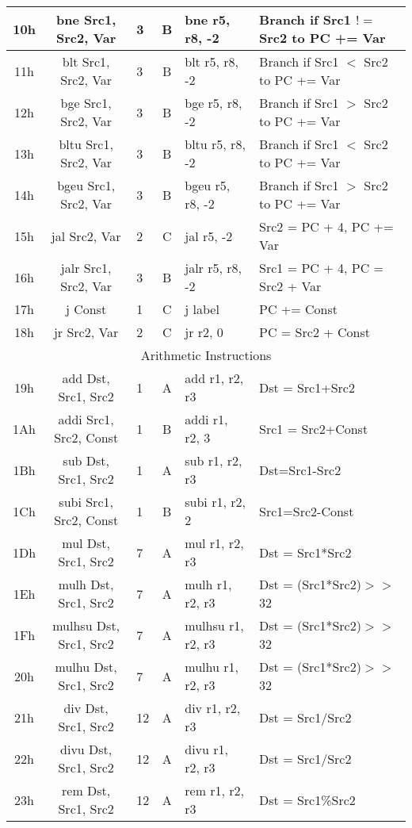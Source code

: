 \documentclass[]{article}
\begin{document}
\begin{longtable}{|c|c|l|c|l|p{5cm}|}
	10h & bne Src1, Src2, Var & 3 & B & bne r5, r8, -2 & Branch if Src1 $!=$ Src2 to PC += Var \\
	\hline
	11h & blt Src1, Src2, Var & 3 & B & blt r5, r8, -2 & Branch if Src1 $<$ Src2 to PC += Var \\
	\hline
	12h & bge Src1, Src2, Var & 3 & B & bge r5, r8, -2 & Branch if Src1 $>$ Src2 to PC += Var \\
	\hline
	13h & bltu Src1, Src2, Var & 3 & B & bltu r5, r8, -2 & Branch if Src1 $<$ Src2 to PC += Var \\
	\hline
	14h & bgeu Src1, Src2, Var & 3 & B & bgeu r5, r8, -2 & Branch if Src1 $>$ Src2 to PC += Var \\
	\hline
	15h & jal Src2, Var & 2 & C & jal r5, -2 & Src2 = PC + 4, PC += Var \\
	\hline
	16h & jalr Src1, Src2, Var & 3 & B & jalr r5, r8, -2 & Src1 = PC + 4, PC = Src2 + Var \\
	\hline
	17h & j Const & 1 & C & j label & PC += Const \\
	\hline
	18h & jr Src2, Var & 2 & C & jr r2, 0 & PC = Src2 + Const \\
	\hline
	\multicolumn{6}{|c|}{Arithmetic Instructions} \\
	\hline
	19h & add Dst, Src1, Src2 & 1 & A & add r1, r2, r3 & Dst = Src1+Src2 \\
	\hline
	1Ah & addi Src1, Src2, Const & 1 & B & addi r1, r2, 3 & Src1 = Src2+Const \\
	\hline
	1Bh & sub Dst, Src1, Src2 & 1 & A & sub r1, r2, r3 & Dst=Src1-Src2 \\
	\hline
	1Ch & subi Src1, Src2, Const & 1 & B & subi r1, r2, 2 & Src1=Src2-Const \\
	\hline
	1Dh & mul Dst, Src1, Src2 & 7 & A & mul r1, r2, r3 & Dst = Src1*Src2 \\
	\hline
	1Eh & mulh Dst, Src1, Src2 & 7 & A & mulh r1, r2, r3 & Dst = (Src1*Src2)$>>$32 \\
	\hline
	1Fh & mulhsu Dst, Src1, Src2 & 7 & A & mulhsu r1, r2, r3 & Dst = (Src1*Src2)$>>$32 \\
	\hline
	20h & mulhu Dst, Src1, Src2 & 7 & A & mulhu r1, r2, r3 & Dst = (Src1*Src2)$>>$32 \\
	\hline
	21h & div Dst, Src1, Src2 & 12 & A & div r1, r2, r3 & Dst = Src1/Src2 \\
	\hline
	22h & divu Dst, Src1, Src2 & 12 & A & divu r1, r2, r3 & Dst = Src1/Src2 \\
	\hline
	23h & rem Dst, Src1, Src2 & 12 & A & rem r1, r2, r3 & Dst = Src1\%Src2 \\

\end{longtable}
\end{document}
